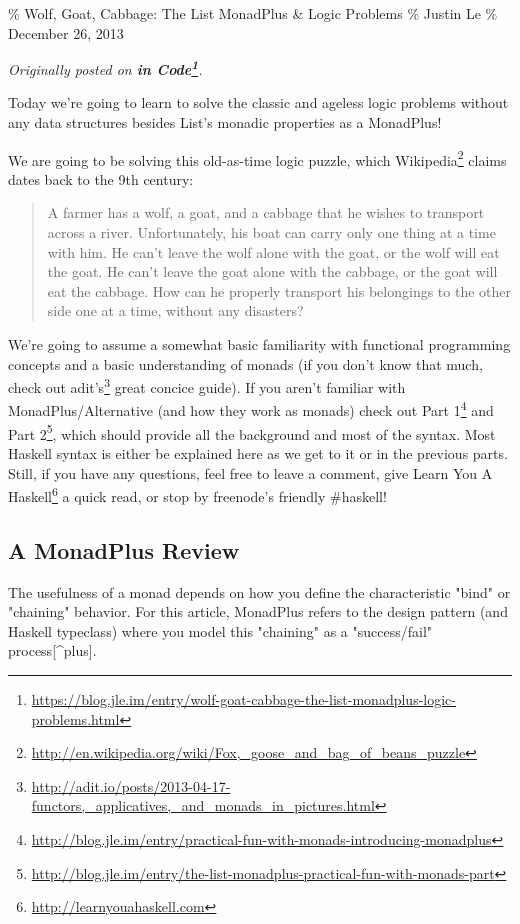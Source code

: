 \documentclass[]{article}
\renewcommand{\href}[2]{#2\footnote{\url{#1}}}
\begin{document}
\% Wolf, Goat, Cabbage: The List MonadPlus \& Logic Problems \% Justin Le \%
December 26, 2013

\emph{Originally posted on
\textbf{\href{https://blog.jle.im/entry/wolf-goat-cabbage-the-list-monadplus-logic-problems.html}{in
Code}}.}

Today we're going to learn to solve the classic and ageless logic problems
without any data structures besides List's monadic properties as a MonadPlus!

We are going to be solving this old-as-time logic puzzle, which
\href{http://en.wikipedia.org/wiki/Fox,_goose_and_bag_of_beans_puzzle}{Wikipedia}
claims dates back to the 9th century:

\begin{quote}
A farmer has a wolf, a goat, and a cabbage that he wishes to transport across a
river. Unfortunately, his boat can carry only one thing at a time with him. He
can't leave the wolf alone with the goat, or the wolf will eat the goat. He
can't leave the goat alone with the cabbage, or the goat will eat the cabbage.
How can he properly transport his belongings to the other side one at a time,
without any disasters?
\end{quote}

We're going to assume a somewhat basic familiarity with functional programming
concepts and a basic understanding of monads (if you don't know that much, check
out
\href{http://adit.io/posts/2013-04-17-functors,_applicatives,_and_monads_in_pictures.html}{adit's}
great concice guide). If you aren't familiar with MonadPlus/Alternative (and how
they work as monads) check out
\href{http://blog.jle.im/entry/practical-fun-with-monads-introducing-monadplus}{Part
1} and
\href{http://blog.jle.im/entry/the-list-monadplus-practical-fun-with-monads-part}{Part
2}, which should provide all the background and most of the syntax. Most Haskell
syntax is either be explained here as we get to it or in the previous parts.
Still, if you have any questions, feel free to leave a comment, give
\href{http://learnyouahaskell.com}{Learn You A Haskell} a quick read, or stop by
freenode's friendly \#haskell!

\subsection{A MonadPlus Review}

The usefulness of a monad depends on how you define the characteristic "bind" or
"chaining" behavior. For this article, MonadPlus refers to the design pattern
(and Haskell typeclass) where you model this "chaining" as a "success/fail"
process{[}\^{}plus{]}.
\end{document}
